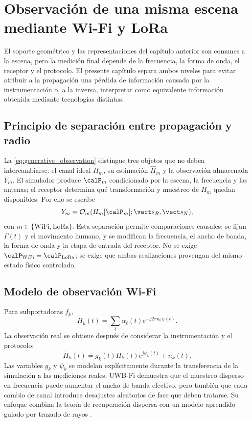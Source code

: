 \chapter{Observación de una misma escena mediante Wi-Fi y LoRa}
\label{ch:radio_obs}

El soporte geométrico y las representaciones del capítulo anterior son comunes a la escena,
pero la medición final depende de la frecuencia, la forma de onda, el receptor y el
protocolo. El presente capítulo separa ambos niveles para evitar atribuir a la propagación
una pérdida de información causada por la instrumentación o, a la inversa, interpretar
como equivalente información obtenida mediante tecnologías distintas.

\section{Principio de separación entre propagación y radio}

La \cref{eq:generative_observation} distingue tres objetos que no deben intercambiarse: el canal ideal $H_m$, su estimación $\widehat H_m$ y la observación almacenada $Y_m$. El simulador produce $\calP_m$ condicionado por la escena, la frecuencia y las antenas; el receptor determina qué transformación y muestreo de $H_m$ quedan disponibles. Por ello se escribe
\begin{equation}
Y_m=\mathcal O_m(H_m[\calP_m];\vect s_R,\vect s_N),
\end{equation}
con $m\in\{\mathrm{WiFi},\mathrm{LoRa}\}$. Esta separación permite comparaciones causales: se fijan $\Gamma(t)$ y el movimiento humano, y se modifican la frecuencia, el ancho de banda, la forma de onda y la etapa de entrada del receptor. No se exige $\calP_{\rm WiFi}=\calP_{\rm LoRa}$; se exige que ambas realizaciones provengan del mismo estado físico controlado.

\section{Modelo de observación Wi-Fi}

Para subportadoras $f_k$,
\begin{equation}
H_k(t)=\sum_{\ell}\alpha_\ell(t)e^{-j2\pi\nu_k\tau_\ell(t)}.
\end{equation}
La observación real se obtiene después de considerar la instrumentación y el protocolo:
\begin{equation}
\widetilde H_k(t)=g_k(t)H_k(t)e^{j\psi_k(t)}+n_k(t).
\end{equation}
Las variables $g_k$ y $\psi_k$ se modelan explícitamente durante la transferencia de la simulación a las mediciones reales. UWB-Fi demuestra que el muestreo disperso en frecuencia puede aumentar el ancho de banda efectivo, pero también que cada cambio de canal introduce desajustes aleatorios de fase que deben tratarse. Su enfoque combina la teoría de recuperación dispersa con un modelo aprendido guiado por trazado de rayos \citep{Li2024UWBFI}.


